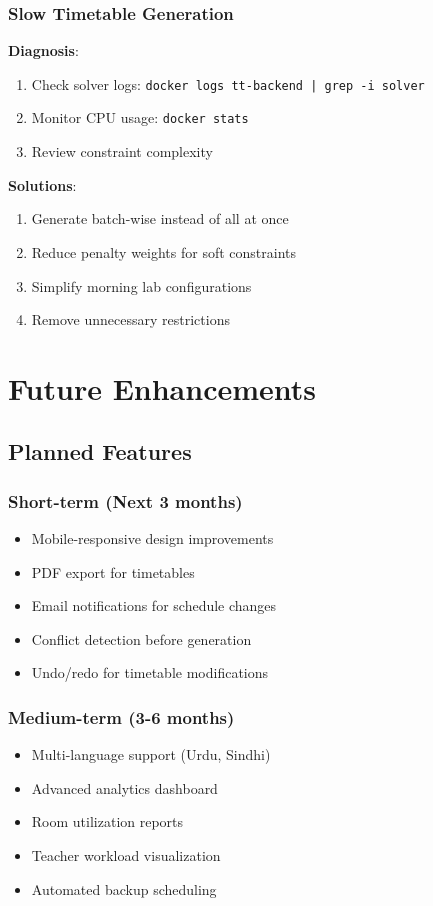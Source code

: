 \documentclass[12pt,a4paper]{article}
\begin{document}
\subsubsection{Slow Timetable Generation}
\textbf{Diagnosis}:
\begin{enumerate}
    \item Check solver logs: \texttt{docker logs tt-backend | grep -i solver}
    \item Monitor CPU usage: \texttt{docker stats}
    \item Review constraint complexity
\end{enumerate}

\textbf{Solutions}:
\begin{enumerate}
    \item Generate batch-wise instead of all at once
    \item Reduce penalty weights for soft constraints
    \item Simplify morning lab configurations
    \item Remove unnecessary restrictions
\end{enumerate}

\section{Future Enhancements}

\subsection{Planned Features}

\subsubsection{Short-term (Next 3 months)}
\begin{itemize}
    \item Mobile-responsive design improvements
    \item PDF export for timetables
    \item Email notifications for schedule changes
    \item Conflict detection before generation
    \item Undo/redo for timetable modifications
\end{itemize}

\subsubsection{Medium-term (3-6 months)}
\begin{itemize}
    \item Multi-language support (Urdu, Sindhi)
    \item Advanced analytics dashboard
    \item Room utilization reports
    \item Teacher workload visualization
    \item Automated backup scheduling
\end{itemize}
\end{document}
